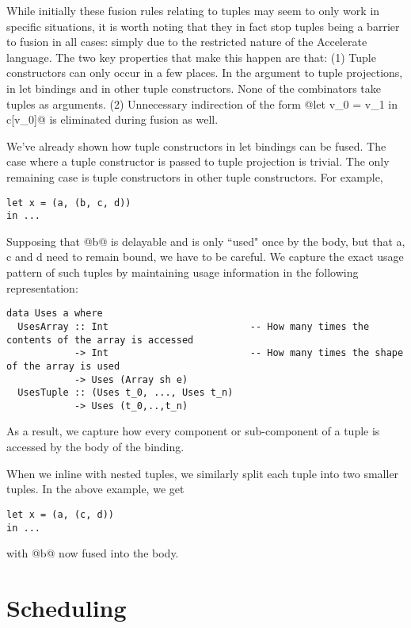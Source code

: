 
While initially these fusion rules relating to tuples may seem to only work in specific situations, it is worth noting that they in fact stop tuples being a barrier to fusion in all cases: simply due to the restricted nature of the Accelerate language. The two key properties that make this happen are that:
  (1) Tuple constructors can only occur in a few places. In the argument to tuple projections, in let bindings and in other tuple constructors. None of the combinators take tuples as arguments.
  (2) Unnecessary indirection of the form @let v_0 = v_1 in c[v_0]@ is eliminated during fusion as well.

We've already shown how tuple constructors in let bindings can be fused. The case where a tuple constructor is passed to tuple projection is trivial. The only remaining case is tuple constructors in other tuple constructors. For example,
%
\begin{lstlisting}
let x = (a, (b, c, d))
in ...
\end{lstlisting}
%
Supposing that @b@ is delayable and is only ``used" once by the body, but that a, c and d need to remain bound, we have to be careful. We capture the exact usage pattern of such tuples by maintaining usage information in the following representation:
%
\begin{lstlisting}
data Uses a where
  UsesArray :: Int                         -- How many times the contents of the array is accessed
            -> Int                         -- How many times the shape of the array is used
            -> Uses (Array sh e)
  UsesTuple :: (Uses t_0, ..., Uses t_n)
            -> Uses (t_0,..,t_n)
\end{lstlisting}
%
As a result, we capture how every component or sub-component of a tuple is accessed by the body of the binding.

When we inline with nested tuples, we similarly split each tuple into two smaller tuples. In the above example, we get
%
\begin{lstlisting}
let x = (a, (c, d))
in ...
\end{lstlisting}
%
with @b@ now fused into the body.


\section{Scheduling}
\label{sec:scheduling}

